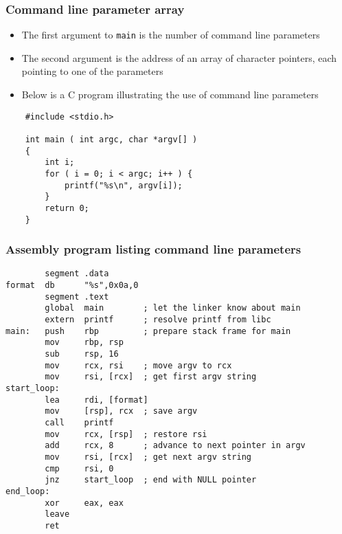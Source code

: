 \documentclass{beamer}
\begin{document}
\begin{frame}[fragile]
    \frametitle{Command line parameter array}
    \begin{itemize}
        \item The first argument to {\tt main} is the number of command line parameters
        \item The second argument is the address of an array of character pointers, each
              pointing to one of the parameters
        \item Below is a C program illustrating the use of command line parameters
    \end{itemize}
\begin{verbatim}
    #include <stdio.h>

    int main ( int argc, char *argv[] )
    {
        int i;
        for ( i = 0; i < argc; i++ ) {
            printf("%s\n", argv[i]);
        }
        return 0;
    }
\end{verbatim}
\end{frame}

\begin{frame}[fragile]
    \frametitle{Assembly program listing command line parameters}
    \footnotesize
\begin{verbatim}
        segment .data
format  db      "%s",0x0a,0
        segment .text
        global  main        ; let the linker know about main
        extern  printf      ; resolve printf from libc
main:   push    rbp         ; prepare stack frame for main
        mov     rbp, rsp
        sub     rsp, 16
        mov     rcx, rsi    ; move argv to rcx
        mov     rsi, [rcx]  ; get first argv string
start_loop:   
        lea     rdi, [format]
        mov     [rsp], rcx  ; save argv
        call    printf
        mov     rcx, [rsp]  ; restore rsi
        add     rcx, 8      ; advance to next pointer in argv
        mov     rsi, [rcx]  ; get next argv string
        cmp     rsi, 0      
        jnz     start_loop  ; end with NULL pointer
end_loop:
        xor     eax, eax
        leave
        ret
\end{verbatim}
\end{frame}
\end{document}
